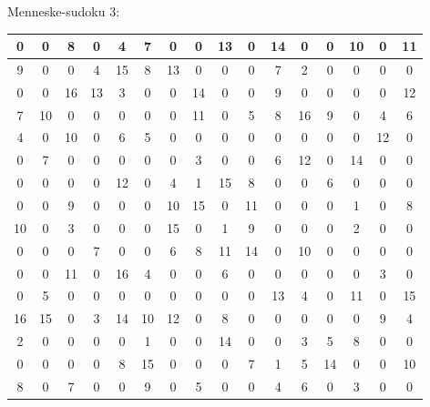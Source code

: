 \documentclass[]{report}
\begin{document}
Menneske-sudoku 3:
\begin{tabular}{|c|c|c|c||c|c|c|c||c|c|c|c||c|c|c|c}
\hline
0&0&8&0&4&7&0&0&13&0&14&0&0&10&0&11\\\hline
9&0&0&4&15&8&13&0&0&0&7&2&0&0&0&0\\\hline
0&0&16&13&3&0&0&14&0&0&9&0&0&0&0&12\\\hline
7&10&0&0&0&0&0&11&0&5&8&16&9&0&4&6\\\hline\hline
4&0&10&0&6&5&0&0&0&0&0&0&0&0&12&0\\\hline
0&7&0&0&0&0&0&3&0&0&6&12&0&14&0&0\\\hline
0&0&0&0&12&0&4&1&15&8&0&0&6&0&0&0\\\hline
0&0&9&0&0&0&10&15&0&11&0&0&0&1&0&8\\\hline\hline
10&0&3&0&0&0&15&0&1&9&0&0&0&2&0&0\\\hline
0&0&0&7&0&0&6&8&11&14&0&10&0&0&0&0\\\hline
0&0&11&0&16&4&0&0&6&0&0&0&0&0&3&0\\\hline
0&5&0&0&0&0&0&0&0&0&13&4&0&11&0&15\\\hline\hline
16&15&0&3&14&10&12&0&8&0&0&0&0&0&9&4\\\hline
2&0&0&0&0&1&0&0&14&0&0&3&5&8&0&0\\\hline
0&0&0&0&8&15&0&0&0&7&1&5&14&0&0&10\\\hline
8&0&7&0&0&9&0&5&0&0&4&6&0&3&0&0\\\hline
\end{tabular}
\end{document}
